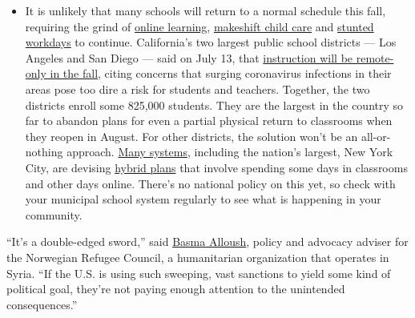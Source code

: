 \begin{itemize}
  \begin{itemize}
  \tightlist
  \item
    It is unlikely that many schools will return to a normal schedule
    this fall, requiring the grind of
    \href{https://www.nytimes3xbfgragh.onion/2020/06/05/us/coronavirus-education-lost-learning.html?action=click\&pgtype=Article\&state=default\&region=MAIN_CONTENT_3\&context=storylines_faq}{online
    learning},
    \href{https://www.nytimes3xbfgragh.onion/2020/05/29/us/coronavirus-child-care-centers.html?action=click\&pgtype=Article\&state=default\&region=MAIN_CONTENT_3\&context=storylines_faq}{makeshift
    child care} and
    \href{https://www.nytimes3xbfgragh.onion/2020/06/03/business/economy/coronavirus-working-women.html?action=click\&pgtype=Article\&state=default\&region=MAIN_CONTENT_3\&context=storylines_faq}{stunted
    workdays} to continue. California's two largest public school
    districts --- Los Angeles and San Diego --- said on July 13, that
    \href{https://www.nytimes3xbfgragh.onion/2020/07/13/us/lausd-san-diego-school-reopening.html?action=click\&pgtype=Article\&state=default\&region=MAIN_CONTENT_3\&context=storylines_faq}{instruction
    will be remote-only in the fall}, citing concerns that surging
    coronavirus infections in their areas pose too dire a risk for
    students and teachers. Together, the two districts enroll some
    825,000 students. They are the largest in the country so far to
    abandon plans for even a partial physical return to classrooms when
    they reopen in August. For other districts, the solution won't be an
    all-or-nothing approach.
    \href{https://bioethics.jhu.edu/research-and-outreach/projects/eschool-initiative/school-policy-tracker/}{Many
    systems}, including the nation's largest, New York City, are
    devising
    \href{https://www.nytimes3xbfgragh.onion/2020/06/26/us/coronavirus-schools-reopen-fall.html?action=click\&pgtype=Article\&state=default\&region=MAIN_CONTENT_3\&context=storylines_faq}{hybrid
    plans} that involve spending some days in classrooms and other days
    online. There's no national policy on this yet, so check with your
    municipal school system regularly to see what is happening in your
    community.
  \end{itemize}
\end{itemize}

``It's a double-edged sword,'' said
\href{https://www.mei.edu/experts/basma-alloush}{Basma Alloush}, policy
and advocacy adviser for the Norwegian Refugee Council, a humanitarian
organization that operates in Syria. ``If the U.S. is using such
sweeping, vast sanctions to yield some kind of political goal, they're
not paying enough attention to the unintended consequences.''

